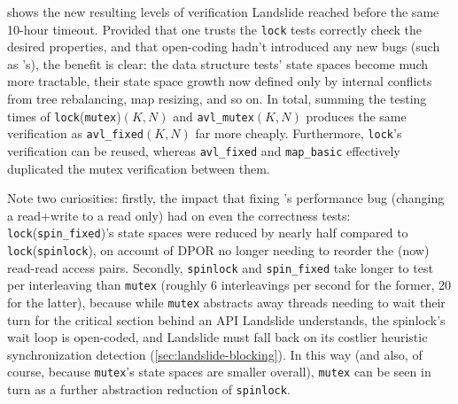  shows the new resulting levels of verification
Landslide reached before the same 10-hour timeout.
Provided that one trusts the {\tt lock} tests correctly check the desired properties,
and that open-coding hadn't introduced any new bugs (such as 's),
the benefit is clear:
the data structure tests' state spaces become much more tractable,
their state space growth now defined only by internal conflicts from tree rebalancing, map resizing, and so on.
In total,
summing the testing times of {\tt lock}({\tt mutex})$(K,N)$ and {\tt avl\_mutex}$(K,N)$
produces the same verification as {\tt avl\_fixed}$(K,N)$ far more cheaply.
Furthermore, {\tt lock}'s verification can be reused,
whereas {\tt avl\_fixed} and {\tt map\_basic} effectively duplicated the mutex verification between them.

Note two curiosities:
firstly,
the impact that fixing 's performance bug
(changing a read+write to a read only)
had on even the correctness tests:
{\tt lock}({\tt spin\_fixed})'s state spaces were reduced by nearly half compared to {\tt lock}({\tt spinlock}),
on account of DPOR no longer needing to reorder the (now) read-read access pairs.
Secondly, {\tt spinlock} and {\tt spin\_fixed} take longer to test per interleaving
than {\tt mutex}
(roughly 6 interleavings per second for the former, 20 for the latter),
because while {\tt mutex} abstracts away threads needing to wait their turn for the critical section
behind an API Landslide understands,
the spinlock's wait loop is open-coded, and Landslide must fall back on its costlier heuristic synchronization detection
(\cref{sec:landslide-blocking}).
In this way (and also, of course, because {\tt mutex}'s state spaces are smaller overall),
{\tt mutex} can be seen in turn as a further abstraction reduction of {\tt spinlock}.


